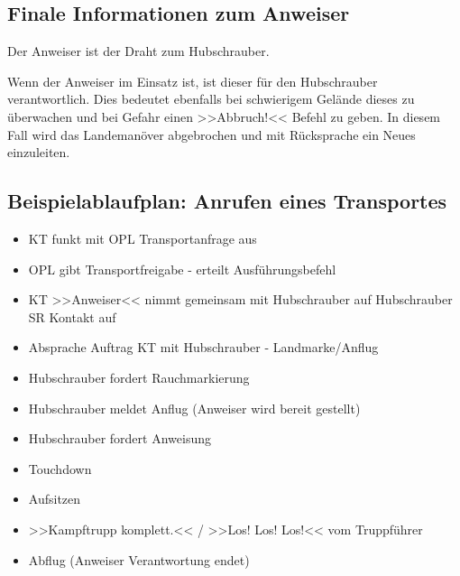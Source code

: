\subsection{Finale Informationen zum Anweiser}

	Der Anweiser ist der Draht zum Hubschrauber.

	Wenn der Anweiser im Einsatz ist, ist dieser für den Hubschrauber verantwortlich. Dies bedeutet ebenfalls bei schwierigem Gelände dieses zu überwachen und bei Gefahr einen >>Abbruch!<< Befehl zu geben. In diesem Fall wird das Landemanöver abgebrochen und mit Rücksprache ein Neues einzuleiten.

 

\subsection{Beispielablaufplan: Anrufen eines Transportes}

	\begin{itemize}

		\item KT funkt mit OPL Transportanfrage aus

    		\item OPL gibt Transportfreigabe - erteilt Ausführungsbefehl

    		\item KT >>Anweiser<< nimmt gemeinsam mit Hubschrauber auf Hubschrauber SR Kontakt auf

    		\item Absprache Auftrag KT mit Hubschrauber - Landmarke/Anflug

    		\item Hubschrauber fordert Rauchmarkierung

    		\item Hubschrauber meldet Anflug (Anweiser wird bereit gestellt)

    		\item Hubschrauber fordert Anweisung

    		\item Touchdown

    		\item Aufsitzen

    		\item >>Kampftrupp komplett.<< / >>Los! Los! Los!<< vom Truppführer

    		\item Abflug (Anweiser Verantwortung endet)

	\end{itemize}
